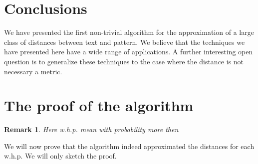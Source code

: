 \documentclass[11pt]{article}
\newtheorem{rem}[thm]{Remark}
\begin{document}
\section{Conclusions}
We have presented the first non-trivial algorithm for the
approximation of a large class of distances between text and
pattern. We believe that the techniques we have presented here have a wide
range of applications. A further interesting open question is to
generalize these techniques to the case where the distance is not necessary a metric.




\begin{small}

\end{small}
\appendix
\section{The proof of the algorithm}
\begin{rem}
Here w.h.p. mean with probability more then 
\end{rem}
We will now prove that the algorithm indeed approximated the
distances for each  w.h.p. We will only sketch
the proof.
\end{document}
